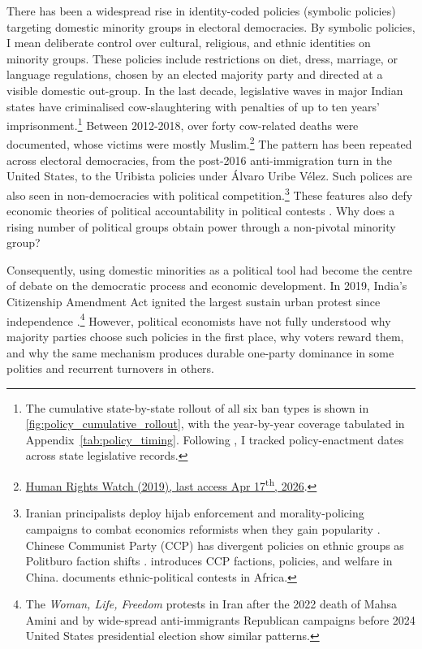 \documentclass[11pt,twoside]{extarticle}
\begin{document}
There has been a widespread rise in identity-coded policies (symbolic policies) targeting domestic minority groups in electoral democracies. By symbolic policies, I mean deliberate control over cultural, religious, and ethnic identities on minority groups. These policies include restrictions on diet, dress, marriage, or language regulations, chosen by an elected majority party and directed at a visible domestic out-group. In the last decade, legislative waves in major Indian states have criminalised cow-slaughtering with penalties of up to ten years' imprisonment.\footnote{The cumulative state-by-state rollout of all six ban types is shown in \autoref{fig:policy_cumulative_rollout}, with the year-by-year coverage tabulated in Appendix~\autoref{tab:policy_timing}. Following \citet*{dasguptaNutritionalCostBeef2023}, I tracked policy-enactment dates across state legislative records.} Between 2012-2018, over forty cow-related deaths were documented, whose victims were mostly Muslim.\footnote{\href{https://www.hrw.org/report/2019/02/19/violent-cow-protection-india/vigilante-groups-attack-minorities}{Human Rights Watch (2019), last access Apr 17\textsuperscript{th}, 2026}.} The pattern has been repeated across electoral democracies, from the post-2016 anti-immigration turn in the United States, to the Uribista policies under Álvaro Uribe Vélez. Such polices are also seen in non-democracies with political competition.\footnote{Iranian principalists deploy hijab enforcement and morality-policing campaigns to combat economics reformists when they gain popularity \citep*{bajoghliIranReframedAnxieties2020}. Chinese Communist Party (CCP) has divergent policies on ethnic groups as Politburo faction shifts \citep*{leiboldEthnicPolicyChina2013}. \citet*{francoisFactionsNondemocraciesTheory2023} introduces CCP factions, policies, and welfare in China. \citet*{francoisHowPowerShared2015} documents ethnic-political contests in Africa.} These features also defy economic theories of political accountability in political contests \citep*{barroControlPoliticiansEconomic1973,ferejohnIncumbentPerformanceElectoral1986}. Why does a rising number of political groups obtain power through a non-pivotal minority group?


Consequently, using domestic minorities as a political tool had become the centre of debate on the democratic process and economic development. In 2019, India's Citizenship Amendment Act ignited the largest sustain urban protest since independence \citep{jaffrelotModisIndiaHindu2021}.\footnote{The \emph{Woman, Life, Freedom} protests in Iran after the 2022 death of Mahsa Amini and by wide-spread anti-immigrants Republican campaigns before 2024 United States presidential election show similar patterns.} However, political economists have not fully understood why majority parties choose such policies in the first place, why voters reward them, and why the same mechanism produces durable one-party dominance in some polities and recurrent turnovers in others.
\end{document}
